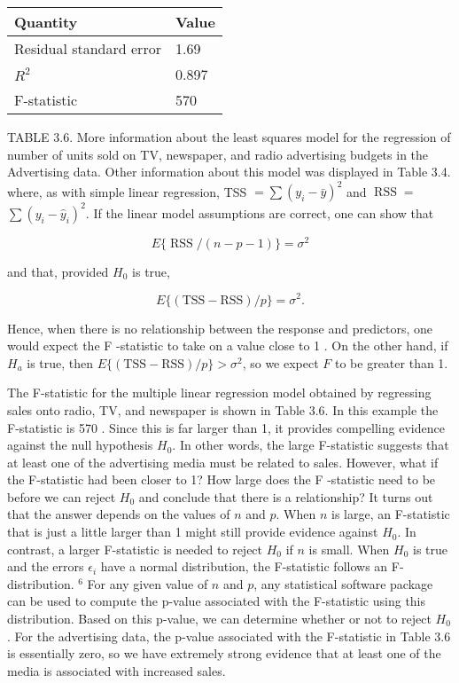 \documentclass[10pt]{article}
\begin{document}
\begin{center}
\begin{tabular}{l|l}
\hline
Quantity & Value \\
\hline
Residual standard error & 1.69 \\
$R^{2}$ & 0.897 \\
F-statistic & 570 \\
\hline
\end{tabular}
\end{center}

TABLE 3.6. More information about the least squares model for the regression of number of units sold on TV, newspaper, and radio advertising budgets in the Advertising data. Other information about this model was displayed in Table 3.4.\\
where, as with simple linear regression, TSS $=\sum\left(y_{i}-\bar{y}\right)^{2}$ and $\operatorname{RSS}=$ $\sum\left(y_{i}-\hat{y}_{i}\right)^{2}$. If the linear model assumptions are correct, one can show that

$$
E\{\operatorname{RSS} /(n-p-1)\}=\sigma^{2}
$$

and that, provided $H_{0}$ is true,

$$
E\{(\mathrm{TSS}-\mathrm{RSS}) / p\}=\sigma^{2} .
$$

Hence, when there is no relationship between the response and predictors, one would expect the F -statistic to take on a value close to 1 . On the other hand, if $H_{a}$ is true, then $E\{(\mathrm{TSS}-\mathrm{RSS}) / p\}>\sigma^{2}$, so we expect $F$ to be greater than 1.

The F-statistic for the multiple linear regression model obtained by regressing sales onto radio, TV, and newspaper is shown in Table 3.6. In this example the F-statistic is 570 . Since this is far larger than 1, it provides compelling evidence against the null hypothesis $H_{0}$. In other words, the large F-statistic suggests that at least one of the advertising media must be related to sales. However, what if the F-statistic had been closer to 1? How large does the F -statistic need to be before we can reject $H_{0}$ and conclude that there is a relationship? It turns out that the answer depends on the values of $n$ and $p$. When $n$ is large, an F-statistic that is just a little larger than 1 might still provide evidence against $H_{0}$. In contrast, a larger F-statistic is needed to reject $H_{0}$ if $n$ is small. When $H_{0}$ is true and the errors $\epsilon_{i}$ have a normal distribution, the F-statistic follows an F-distribution. ${ }^{6}$ For any given value of $n$ and $p$, any statistical software package can be used to compute the p-value associated with the F-statistic using this distribution. Based on this p-value, we can determine whether or not to reject $H_{0}$. For the advertising data, the p-value associated with the F-statistic in Table 3.6 is essentially zero, so we have extremely strong evidence that at least one of the media is associated with increased sales.
\end{document}
